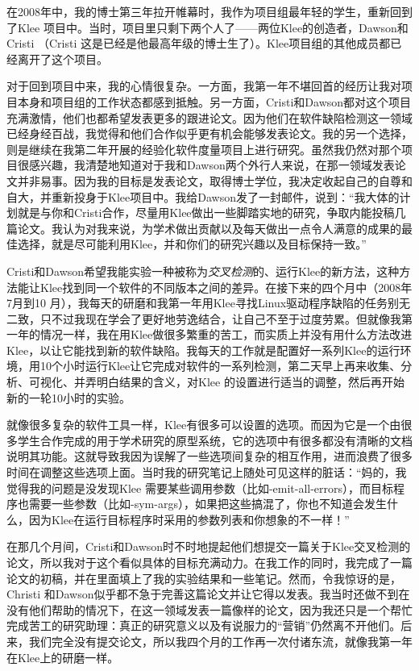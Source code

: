 \documentclass[12pt,UTF8,nofonts]{book}
\begin{document}

在2008年中，我的博士第三年拉开帷幕时，我作为项目组最年轻的学生，重新回到了Klee 项目中。当时，项目里只剩下两个人了——两位Klee的创造者，Dawson和Cristi （Cristi 这是已经是他最高年级的博士生了）。Klee项目组的其他成员都已经离开了这个项目。

对于回到项目中来，我的心情很复杂。一方面，我第一年不堪回首的经历让我对项目本身和项目组的工作状态都感到抵触。另一方面，Cristi和Dawson都对这个项目充满激情，他们也都希望发表更多的跟进论文。因为他们在软件缺陷检测这一领域已经身经百战，我觉得和他们合作似乎更有机会能够发表论文。我的另一个选择，则是继续在我第二年开展的经验化软件度量项目上进行研究。虽然我仍然对那个项目很感兴趣，我清楚地知道对于我和Dawson两个外行人来说，在那一领域发表论文并非易事。因为我的目标是发表论文，取得博士学位，我决定收起自己的自尊和自大，并重新投身于Klee项目中。我给Dawson发了一封邮件，说到：“我大体的计划就是与你和Cristi合作，尽量用Klee做出一些脚踏实地的研究，争取内能投稿几篇论文。我认为对我来说，为学术做出贡献以及每天做出一点令人满意的成果的最佳选择，就是尽可能利用Klee，并和你们的研究兴趣以及目标保持一致。”

\breakline

Cristi和Dawson希望我能实验一种被称为\emph{交叉检测}的、运行Klee的新方法，这种方法能让Klee找到同一个软件的不同版本之间的差异。在接下来的四个月中（2008年7月到10 月），我每天的研磨和我第一年用Klee寻找Linux驱动程序缺陷的任务别无二致，只不过我现在学会了更好地劳逸结合，让自己不至于过度劳累。但就像我第一年的情况一样，我在用Klee做很多繁重的苦工，而实质上并没有用什么方法改进Klee，以让它能找到新的软件缺陷。我每天的工作就是配置好一系列Klee的运行环境，用10个小时运行Klee让它完成对软件的一系列检测，第二天早上再来收集、分析、可视化、并弄明白结果的含义，对Klee 的设置进行适当的调整，然后再开始新的一轮10小时的实验。

就像很多复杂的软件工具一样，Klee有很多可以设置的选项。而因为它是一个由很多学生合作完成的用于学术研究的原型系统，它的选项中有很多都没有清晰的文档说明其功能。这就导致我因为误解了一些选项间复杂的相互作用，进而浪费了很多时间在调整这些选项上面。当时我的研究笔记上随处可见这样的脏话：“妈的，我觉得我的问题是没发现Klee 需要某些调用参数（比如-emit-all-errors），而目标程序也需要一些参数（比如-sym-args），如果把这些搞混了，你也不知道会发生什么，因为Klee在运行目标程序时采用的参数列表和你想象的不一样！”

在那几个月间，Cristi和Dawson时不时地提起他们想提交一篇关于Klee交叉检测的论文，所以我对于这个看似具体的目标充满动力。在我工作的同时，我完成了一篇论文的初稿，并在里面填上了我的实验结果和一些笔记。然而，令我惊讶的是，Christi 和Dawson似乎都不急于完善这篇论文并让它得以发表。我当时还做不到在没有他们帮助的情况下，在这一领域发表一篇像样的论文，因为我还只是一个帮忙完成苦工的研究助理：真正的研究意义以及有说服力的“营销”仍然离不开他们。后来，我们完全没有提交论文，所以我四个月的工作再一次付诸东流，就像我第一年在Klee上的研磨一样。
\end{document}
